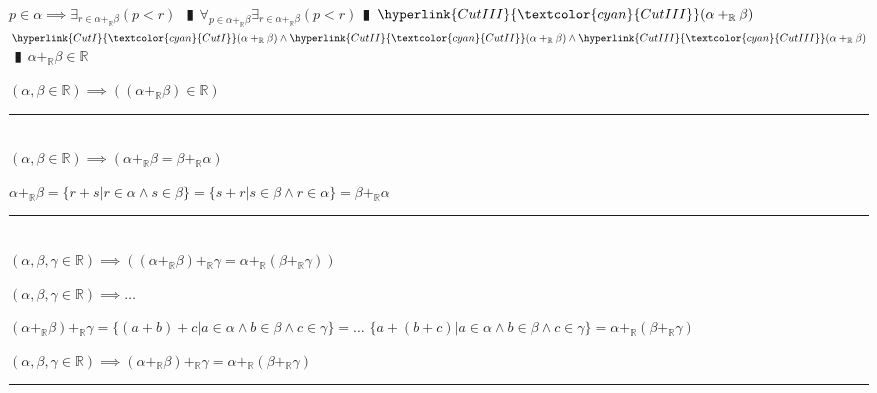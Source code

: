 \documentclass{book}
\newcommand{\wff}[1]{\hypertarget{#1}{\fbox{\textcolor{red}{$#1$}}\phantom{--}}}
\newcommand{\rf}[1]{\hyperlink{#1}{\textcolor{cyan}{#1}}}
\newcommand{\pipe}{$\phantom{(}\vrectangleblack\phantom{)}$}
\newcommand{\pr}[1]{\left(#1\right)}
\begin{document}
\begin{enumerate}
\begin{enumerate}
    \lit $p \in \alpha \implies \exists_{r \in \alpha +_{\mathbb{R}} \beta}(p < r)$ \pipe $\forall_{p \in \alpha +_{\mathbb{R}} \beta} \exists_{r \in \alpha +_{\mathbb{R}} \beta}(p < r)$\pipe $\rf{CutIII}(\alpha +_{\mathbb{R}} \beta)$
    \lit $\rf{CutI}(\alpha +_{\mathbb{R}} \beta) \land \rf{CutII}(\alpha +_{\mathbb{R}} \beta) \land \rf{CutIII}(\alpha +_{\mathbb{R}} \beta)$ \pipe $\alpha +_{\mathbb{R}} \beta \in \mathbb{R}$
  \end{enumerate}
  \lit $(\alpha, \beta \in \mathbb{R}) \implies \pr{(\alpha +_{\mathbb{R}} \beta) \in \mathbb{R}}$
\end{enumerate} \vspace{.75mm} \hrule \vspace{.75mm} \ \\

\wff{FieldAdditionCommutativityOfR} $(\alpha, \beta \in \mathbb{R}) \implies (\alpha +_{\mathbb{R}} \beta = \beta +_{\mathbb{R}} \alpha)$
\begin{enumerate}
  \lit $\alpha +_{\mathbb{R}} \beta = \{r + s | r \in \alpha \land s \in \beta\} = \{s + r | s \in \beta \land r \in \alpha\} = \beta +_{\mathbb{R}} \alpha$
\end{enumerate} \vspace{.75mm} \hrule \vspace{.75mm} \ \\

\wff{FieldAdditionAssociativityOfR} $(\alpha, \beta, \gamma \in \mathbb{R}) \implies \pr{(\alpha +_{\mathbb{R}} \beta) +_{\mathbb{R}} \gamma = \alpha +_{\mathbb{R}} (\beta +_{\mathbb{R}} \gamma)}$
\begin{enumerate}
  \lit $(\alpha, \beta, \gamma \in \mathbb{R}) \implies \ldots$
  \begin{enumerate}
    \lit $(\alpha +_{\mathbb{R}} \beta) +_{\mathbb{R}} \gamma = \{(a + b) + c | a \in \alpha \land b \in \beta \land c \in \gamma\} = \ldots$
    \lit $\{a + (b + c) | a \in \alpha \land b \in \beta \land c \in \gamma\} = \alpha +_{\mathbb{R}} (\beta +_{\mathbb{R}} \gamma)$
  \end{enumerate}
  \lit $(\alpha, \beta, \gamma \in \mathbb{R}) \implies (\alpha +_{\mathbb{R}} \beta) +_{\mathbb{R}} \gamma = \alpha +_{\mathbb{R}} (\beta +_{\mathbb{R}} \gamma)$
\end{enumerate} \vspace{.75mm} \hrule \vspace{.75mm} \ \\
\end{document}
